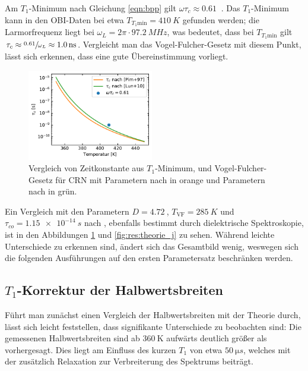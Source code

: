 Am $T_1$-Minimum nach Gleichung \eqref{eqn:bpp} gilt $\omega \tau_c \approx \SI{0.61}{}$ \cite[S. 629]{omegatau061}. Das $T_1$-Minimum kann in den OBI-Daten bei etwa $T_{T_1 \text{min}} = \SI{410}{K}$ gefunden werden; die Larmorfrequenz liegt bei $\omega_L = 2\pi \cdot \SI{97.2}{MHz}$, was bedeutet, dass bei $T_{T_1 \text{min}}$ gilt $\tau_c \approx \sfrac{\SI{0.61}{}}{\omega_L} \approx \SI{1.0}{\nano s}$. Vergleicht man das Vogel-Fulcher-Gesetz mit diesem Punkt, lässt sich erkennen, dass eine gute Übereinstimmung vorliegt.

\begin{figure}
	\vspace{-20pt}
	\begin{center}
		\includegraphics[width=0.49\textwidth]{graphics/plot/vftau.pdf}
	\end{center}
	\vspace{-20pt}
	\caption{Vergleich von Zeitkonstante aus $T_1$-Minimum, und Vogel-Fulcher-Gesetz für CRN mit Parametern nach \cite{PIMENOV199793} in orange und Parametern nach \cite{crn_augsburg} in grün. \label{fig:korrelationszeiten}}
\end{figure}
Ein Vergleich mit den Parametern $D = \SI{4.72}{}$, $T_\text{VF} = \SI{285}{K}$ und $\tau_{co} = \SI{1.15e-14}{s}$ nach \cite{crn_augsburg}, ebenfalls bestimmt durch dielektrische Spektroskopie, ist in den Abbildungen \ref{fig:korrelationszeiten} und \ref{fig:res:theorie_j} zu sehen. Während leichte Unterschiede zu erkennen sind, ändert sich das Gesamtbild wenig, weswegen sich die folgenden Ausführungen auf den ersten Parametersatz beschränken werden.


\subsection{$T_1$-Korrektur der Halbwertsbreiten} \label{sub:res:t1korr}

Führt man zunächst einen Vergleich der Halbwertsbreiten mit der Theorie durch, lässt sich leicht feststellen, dass signifikante Unterschiede zu beobachten sind: Die gemessenen Halbwertsbreiten sind ab $\SI{360}{\kelvin}$ aufwärts deutlich größer als vorhergesagt. Dies liegt am Einfluss des kurzen $T_1$ von etwa $\SI{50}{\micro s}$, welches mit der zusätzlich Relaxation zur Verbreiterung des Spektrums beiträgt.

